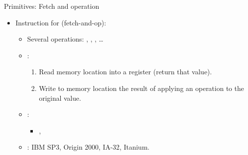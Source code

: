 \begin{frame}[t]{Primitives: Fetch and operation}
\begin{itemize}
  \item Instruction for  (fetch-and-op):
    \begin{itemize}
      \item Several operations: , , , \ldots

      \item {}:
        \begin{enumerate}

          \item Read memory location into a register (return that value).

          \item Write to memory location the result of applying an operation to the original value.
        \end{enumerate}

      \item {}:
        \begin{itemize}
          \item {} , 
        \end{itemize}

      \item {}: IBM SP3, Origin 2000, IA-32, Itanium.
    \end{itemize}
\end{itemize}
\end{frame}

